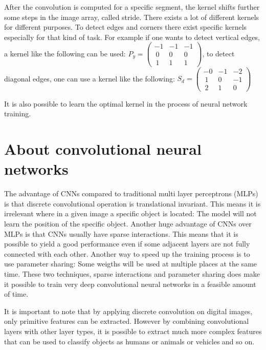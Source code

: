 After the convolution is computed for a specific segment, the kernel shifts further some steps in the image array, called stride. There exists a lot of different kernels for different purposes. To detect edges and corners there exist specific kernels especially for that kind of task. For example if one wants to detect vertical edges, a kernel like the following can be used:
$P_y = \begin{pmatrix}-1 & -1 & -1 \\\ 0 & 0 & 0 \\\ 1 & 1 & 1\end{pmatrix}$, \vspace{0.5cm} to detect diagonal edges, one can use a kernel like the following:
$S_d = \begin{pmatrix}-0 & -1 & -2 \\\ 1 & 0 & -1 \\\ 2 & 1 & 0\end{pmatrix}$ \vspace{0.5cm}

It is also possible to learn the optimal kernel in the process of neural network training.

\section{About convolutional neural networks}

The advantage of CNNs compared to traditional multi layer perceptrons (MLPs) is that discrete convolutional operation is translational invariant. This means it is irrelevant where in a given image a specific object is located: The model will not learn the position of the specific object. Another huge advantage of CNNs over MLPs is that CNNs usually have sparse interactions. This means that it is possible to yield a good performance even if some adjacent layers are not fully connected with each other. Another way to speed up the training process is to use parameter sharing: Some weigths will be used at multiple places at the same time. These two techniques, sparse interactions and parameter sharing does make it possible to train very deep convolutional neural networks in a feasible amount of time.

It is important to note that by applying discrete convolution on digital images, only primitive features can be extracted. However by combining convolutional layers with other layer types, it is possible to extract much more complex features that can be used to classify objects as humans or animals or vehicles and so on.

